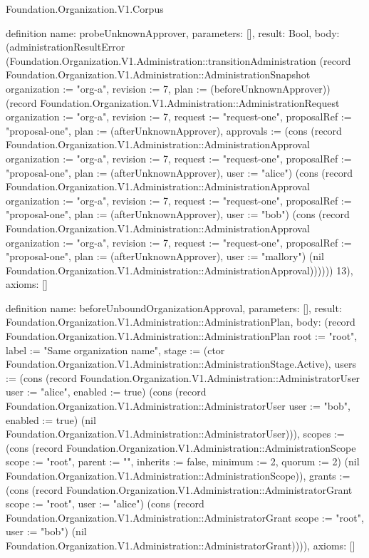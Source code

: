 \begin{lexlean}{Foundation.Organization.V1.Corpus}
\begin{semanticmodule}
definition{
  name: probeUnknownApprover,
  parameters: [],
  result: Bool,
  body: (administrationResultError (Foundation.Organization.V1.Administration::transitionAdministration (record Foundation.Organization.V1.Administration::AdministrationSnapshot {organization := "org-a", revision := 7, plan := (beforeUnknownApprover)}) (record Foundation.Organization.V1.Administration::AdministrationRequest {organization := "org-a", revision := 7, request := "request-one", proposalRef := "proposal-one", plan := (afterUnknownApprover), approvals := (cons (record Foundation.Organization.V1.Administration::AdministrationApproval {organization := "org-a", revision := 7, request := "request-one", proposalRef := "proposal-one", plan := (afterUnknownApprover), user := "alice"}) (cons (record Foundation.Organization.V1.Administration::AdministrationApproval {organization := "org-a", revision := 7, request := "request-one", proposalRef := "proposal-one", plan := (afterUnknownApprover), user := "bob"}) (cons (record Foundation.Organization.V1.Administration::AdministrationApproval {organization := "org-a", revision := 7, request := "request-one", proposalRef := "proposal-one", plan := (afterUnknownApprover), user := "mallory"}) (nil Foundation.Organization.V1.Administration::AdministrationApproval))))})) 13),
  axioms: []
}

definition{
  name: beforeUnboundOrganizationApproval,
  parameters: [],
  result: Foundation.Organization.V1.Administration::AdministrationPlan,
  body: (record Foundation.Organization.V1.Administration::AdministrationPlan {root := "root", label := "Same organization name", stage := (ctor Foundation.Organization.V1.Administration::AdministrationStage.Active), users := (cons (record Foundation.Organization.V1.Administration::AdministratorUser {user := "alice", enabled := true}) (cons (record Foundation.Organization.V1.Administration::AdministratorUser {user := "bob", enabled := true}) (nil Foundation.Organization.V1.Administration::AdministratorUser))), scopes := (cons (record Foundation.Organization.V1.Administration::AdministrationScope {scope := "root", parent := "", inherits := false, minimum := 2, quorum := 2}) (nil Foundation.Organization.V1.Administration::AdministrationScope)), grants := (cons (record Foundation.Organization.V1.Administration::AdministratorGrant {scope := "root", user := "alice"}) (cons (record Foundation.Organization.V1.Administration::AdministratorGrant {scope := "root", user := "bob"}) (nil Foundation.Organization.V1.Administration::AdministratorGrant)))}),
  axioms: []
}


\end{semanticmodule}
\end{lexlean}

